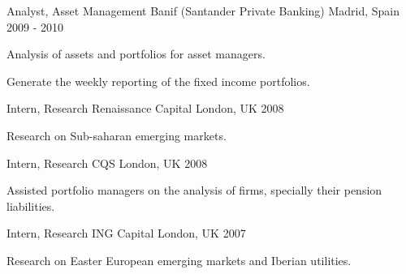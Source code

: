 \begin{cventries}
\cventry
    {Analyst, Asset Management} %
    {Banif (Santander Private Banking)} %
    {Madrid, Spain} %
    {2009 - 2010} %
    {
        \begin{cvitems} %
            \item {Analysis of assets and portfolios for asset managers.}
            \item {Generate the weekly reporting of the fixed income portfolios.}
        \end{cvitems}
    }

\cventry
    {Intern, Research} %
    {Renaissance Capital} %
    {London, UK} %
    {2008} %
    {
        \begin{cvitems} %
            \item {Research on Sub-saharan emerging markets.}
        \end{cvitems}
    }

\cventry
    {Intern, Research} %
    {CQS} %
    {London, UK} %
    {2008} %
    {
        \begin{cvitems} %
            \item {Assisted portfolio managers on the analysis of firms, specially their pension liabilities.}
        \end{cvitems}
    }

\cventry
    {Intern, Research} %
    {ING Capital} %
    {London, UK} %
    {2007} %
    {
        \begin{cvitems} %
            \item {Research on Easter European emerging markets and Iberian utilities.}
        \end{cvitems}
    }

\end{cventries}

